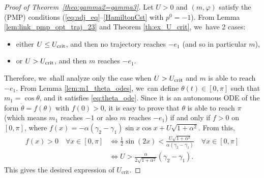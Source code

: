 \documentclass[10pt]{amsart}
\theoremstyle{definition}
\begin{document}
\begin{proof}[Proof of Theorem~\ref{theo:gamma2=gamma3}]
Let $U > 0$ and $(m, \varphi)$ satisfy the (PMP) conditions (\eqref{eq:adj_eq}--\eqref{HamiltonCst} with $p^0 = -1$). From Lemma \ref{lem:link_pmp_opt_traj_23} and Theorem \ref{th:ex_U_crit}, we~have 2 cases:
\begin{itemize}
\item either $U \leq U_\textnormal{crit}$, and then no trajectory reaches $- e_1$ (and so in particular $m$),
\item or $U > U_\textnormal{crit}$, and then $m$ reaches $- e_1$.
\end{itemize}

Therefore, we~shall analyze only the case when $U > U_{\rm crit}$ and $m$ is able to reach~$- e_1$. From Lemma \ref{lem:m1_theta_odes}, we~can define $\theta (t) \in [0, \pi]$ such that $m_1 = \cos \theta$, and it satisfies \eqref{eq:theta_ode}. Since it is an autonomous ODE of the form $\dot \theta = f(\theta)$ with $f(0) > 0$, it is easy to prove that $\theta$ is able to reach $\pi$ (which means $m_1$ reaches $-1$ or also $m$ reaches $- e_1$) if and only if $f > 0$ on $[0, \pi]$, where $f (x) = - \alpha (\gamma_2 - \gamma_1) \sin{x} \cos{x} + U \sqrt{1 + \alpha^2}$.
From this,
\begin{align*}
f (x) > 0 \quad \forall x \in [0, \pi] &\iff \frac{1}{2} \sin{(2x)} < \frac{U \sqrt{1 + \alpha^2}}{\alpha (\gamma_2 - \gamma_1)} \quad \forall x \in [0, \pi] \\
&\iff U > \frac{\alpha}{2 \sqrt{1 + \alpha^2}} (\gamma_2 - \gamma_1).
\end{align*}
This gives the desired expression of $U_{\textrm{crit}}$.


\end{proof}
\end{document}
